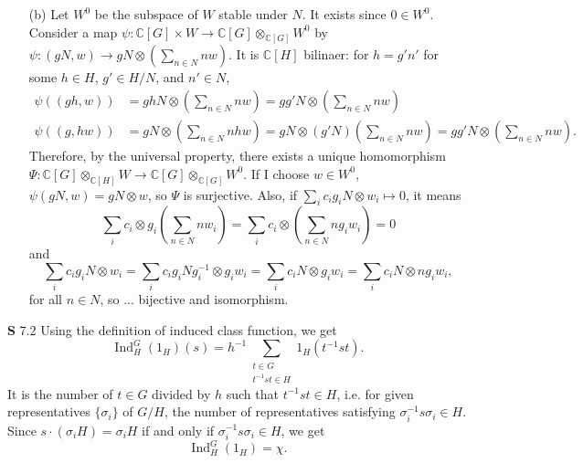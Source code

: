 \documentclass[a4paper, 12pt]{article}
\theoremstyle{Mydefinition}
\theoremstyle{Mytheorem}
\DeclareMathOperator{\Ind}{Ind}
\begin{document}
\begin{enumerate}
    \item[(b)] Let $W^0$ be the subspace of $W$ stable under $N$. It exists since $0\in W^0$. Consider a map $\psi:\mathbb{C}[G]\times W\rightarrow \mathbb{C}[G]\otimes_{\mathbb{C}[G]} W^0$ by $\psi:(gN,w)\rightarrow gN\otimes \left(\sum_{n\in N}nw\right)$. It is $\mathbb{C}[H]$ bilinaer: for $h=g'n'$ for some $h\in H$, $g'\in H/N$, and $n'\in N$,
    \begin{equation}
    \begin{split}
        \psi((gh, w)) &= ghN\otimes \left(\sum_{n\in N}nw\right) = gg'N\otimes \left(\sum_{n\in N}nw\right)\\
        \psi((g, hw)) &= gN\otimes \left(\sum_{n\in N}nhw\right) = gN\otimes (g'N)\left(\sum_{n\in N}nw\right) = gg'N\otimes \left(\sum_{n\in N}nw\right).
    \end{split}
    \end{equation}
    Therefore, by the universal property, there exists a unique homomorphism $\Psi:\mathbb{C}[G]\otimes_{\mathbb{C}[H]}W\rightarrow\mathbb{C}[G]\otimes_{\mathbb{C}[G]}W^0$. If I choose $w\in W^0$, $\psi(gN,w) = gN\otimes w$, so $\Psi$ is surjective. Also, if $\sum_i c_i g_iN\otimes w_i\mapsto 0$, it means
    \begin{equation}
        \sum_i c_i\otimes g_i\left(\sum_{n\in N}nw_i\right) = \sum_i c_i\otimes \left(\sum_{n\in N}ng_iw_i\right) = 0
    \end{equation}
    and
    \begin{equation}
        \sum_i c_i g_iN\otimes w_i = \sum_i c_i g_iN g_i^{-1}\otimes g_i w_i = \sum_i c_i N\otimes g_i w_i = \sum_i c_i N\otimes ng_i w_i,
    \end{equation}
    for all $n\in N$, so ... bijective and isomorphism.
\end{enumerate}

\noindent \textbf{S} 7.2
Using the definition of induced class function, we get
\begin{equation}
    \Ind_H^G(1_H)(s) = h^{-1}\sum_{\substack{t\in G\\ t^{-1}st\in H}}1_H(t^{-1}st).
\end{equation}
It is the number of $t\in G$ divided by $h$ such that $t^{-1}st\in H$, i.e. for given representatives $\{\sigma_i\}$ of $G/H$, the number of representatives satisfying $\sigma_i^{-1}s\sigma_i\in H$. Since $s\cdot (\sigma_i H) = \sigma_i H$ if and only if $\sigma_i^{-1}s\sigma_i\in H$, we get
\begin{equation}
    \Ind_H^G(1_H) = \chi.
\end{equation}
\end{document}
